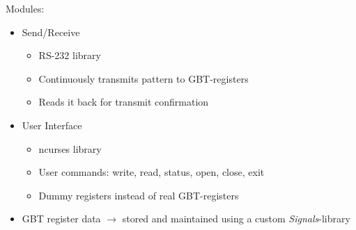 \documentclass[aspectratio=43]{beamer}
\makeatletter
\newenvironment{backgroundblock}[2]{%
  \global\setbox\@backgroundblock=\vbox\bgroup%
    \unvbox\@backgroundblock%
    \vbox to0pt\bgroup\vskip#2\hbox to0pt\bgroup\hskip#1\relax%
}{\egroup\egroup\egroup}
\makeatother
\begin{document}
{\begin{frame}
\Large Modules:\\
\normalsize
\begin{itemize}
\item Send/Receive
	\begin{itemize}
	\item RS-232 library
	\item Continuously transmits pattern to GBT-registers
	\item Reads it back for transmit confirmation
	\end{itemize}
\item User Interface
	\begin{itemize}
	\item ncurses library
	\item User commands: write, read, status, open, close, exit
	\item Dummy registers instead of real GBT-registers
	\end{itemize}
\item GBT register data $\rightarrow$ stored and maintained using a custom \textit{Signals}-library
\end{itemize}

\end{frame}

}
\end{document}
